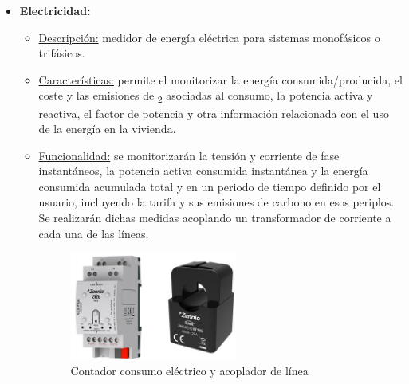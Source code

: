 \begin{itemize}
\item \textbf{Electricidad:} 
	\begin{itemize}
	\item\underline{Descripción:} medidor de energía eléctrica para sistemas monofásicos o trifásicos.
	\item \underline{Características:} permite el monitorizar la energía consumida/producida, el coste y las emisiones de \textsubscript{2} asociadas al consumo, la potencia activa y reactiva, el factor de potencia y otra información relacionada con el uso de la energía en la vivienda.
	\item \underline{Funcionalidad:} se monitorizarán la tensión y corriente de fase instantáneos, la potencia activa consumida instantánea y la energía consumida acumulada total y en un periodo de tiempo definido por el usuario, incluyendo la tarifa y sus emisiones de carbono en esos periplos. Se realizarán dichas medidas acoplando un transformador de corriente a cada una de las líneas. 
	\begin{figure}[h]
	\centering
	\includegraphics[width=0.55\textwidth]{figures/contador_electricidad.png}   
	\caption{Contador consumo eléctrico y acoplador de línea }
	\label{fig:contador_electricidad}
	\end{figure}
	\end{itemize} 


\end{itemize}
